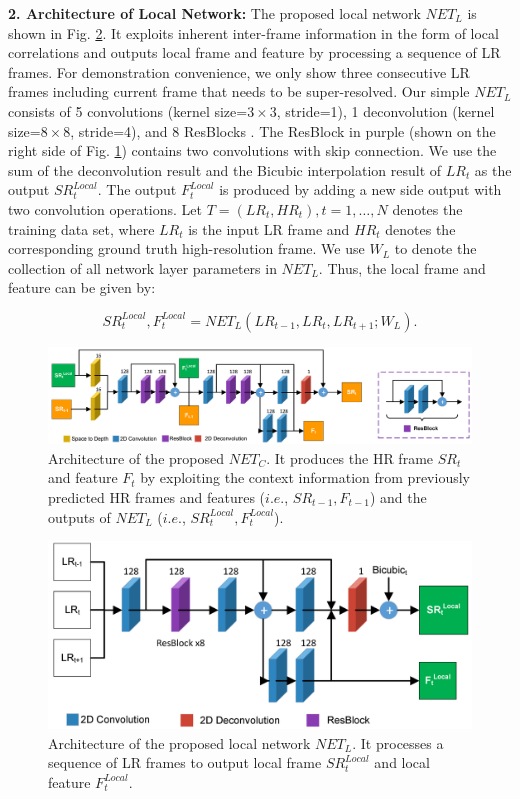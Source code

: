 \documentclass[letterpaper]{article} %
\begin{document}
\textbf{2. Architecture of Local Network:} The proposed local network $NET_L$ is shown in Fig. \ref{figureLocalNetwork}. It exploits inherent inter-frame information in the form of local correlations and outputs local frame and feature by processing a sequence of LR frames. For demonstration convenience, we only show three consecutive LR frames including current frame that needs to be super-resolved. Our simple $NET_L$ consists of 5 convolutions (kernel size=$3\times3$, stride=1), 1 deconvolution (kernel size=$8\times8$, stride=4), and 8 ResBlocks \cite{Lim2017Enhanced}. The ResBlock in purple (shown on the right side of Fig. \ref{figureContextNetwork}) contains two convolutions with skip connection. We use the sum of the deconvolution result and the Bicubic interpolation result of $LR_t$ as the output $SR^{Local}_t$. The output $F^{Local}_t$ is produced by adding a new side output with two convolution operations. Let $T = {(LR_t, HR_t), t=1,\dotsc, N}$ denotes the training data set, where $LR_t$ is the input LR frame and $HR_t$ denotes the corresponding ground truth high-resolution frame. We use $W_L$ to denote the collection of all network layer parameters in $NET_L$. Thus, the local frame and feature can be given by:


\begin{equation}
SR^{Local}_t, F^{Local}_t = NET_L(LR_{t-1}, LR_t, LR_{t+1}; W_L).
\label{equationLocalNetwork}
\end{equation}




\begin{figure}[t]
\centering
\includegraphics[width=17.5 cm]{Fig5.png}
\caption{Architecture of the proposed $NET_C$. It produces the HR frame $SR_t$ and feature $F_t$ by exploiting the context information from previously predicted HR frames and features ($i.e.$, $SR_{t-1}, F_{t-1}$) and the outputs of $NET_L$ ($i.e.$, $SR^{Local}_t, F^{Local}_t$).}
\label{figureContextNetwork}
\end{figure}



\begin{figure}[t]
\centering
\includegraphics[width=8.5 cm]{Fig4.png}
\caption{Architecture of the proposed local network $NET_L$. It processes a sequence of LR frames to output local frame $SR^{Local}_t$ and local feature $F^{Local}_t$.}
\label{figureLocalNetwork}
\end{figure}
\end{document}
